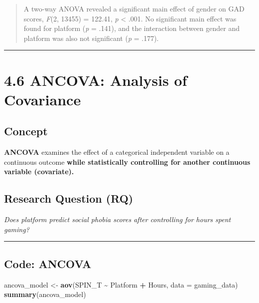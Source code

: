 \documentclass[
]{book}
\newenvironment{Shaded}{\begin{snugshade}}{\end{snugshade}}
\newcommand{\AttributeTok}[1]{\textcolor[rgb]{0.13,0.29,0.53}{#1}}
\newcommand{\FunctionTok}[1]{\textcolor[rgb]{0.13,0.29,0.53}{\textbf{#1}}}
\newcommand{\NormalTok}[1]{#1}
\newcommand{\OtherTok}[1]{\textcolor[rgb]{0.56,0.35,0.01}{#1}}
\newcommand{\SpecialCharTok}[1]{\textcolor[rgb]{0.81,0.36,0.00}{\textbf{#1}}}
\begin{document}
\begin{quote}
A two-way ANOVA revealed a significant main effect of gender on GAD scores, \emph{F}(2, 13455) = 122.41, \emph{p} \textless{} .001. No significant main effect was found for platform (\emph{p} = .141), and the interaction between gender and platform was also not significant (\emph{p} = .177).
\end{quote}

\begin{center}\rule{0.5\linewidth}{0.5pt}\end{center}

\section{4.6 ANCOVA: Analysis of Covariance}\label{ancova-analysis-of-covariance}

\subsection{Concept}\label{concept-5}

\textbf{ANCOVA} examines the effect of a categorical independent variable on a continuous outcome \textbf{while statistically controlling for another continuous variable (covariate).}

\subsection{Research Question (RQ)}\label{research-question-rq-3}

\emph{Does platform predict social phobia scores after controlling for hours spent gaming?}

\begin{center}\rule{0.5\linewidth}{0.5pt}\end{center}

\subsection{Code: ANCOVA}\label{code-ancova}

\begin{Shaded}
\begin{Highlighting}[]
\NormalTok{ancova\_model }\OtherTok{\textless{}{-}} \FunctionTok{aov}\NormalTok{(SPIN\_T }\SpecialCharTok{\textasciitilde{}}\NormalTok{ Platform }\SpecialCharTok{+}\NormalTok{ Hours, }\AttributeTok{data =}\NormalTok{ gaming\_data)}
\FunctionTok{summary}\NormalTok{(ancova\_model)}
\end{Highlighting}
\end{Shaded}
\end{document}
